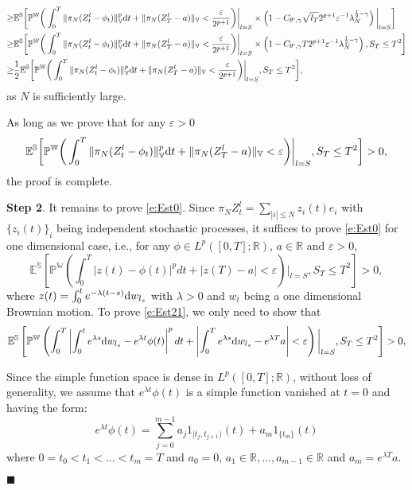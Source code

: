 \documentclass[12pt,a4paper]{article}
\theoremstyle{definition}
\theoremstyle{remark}
\numberwithin{equation}{section}
\newcommand{\E}{\mathbb{E}}            %
\newcommand{\e}{\varepsilon}
\newcommand{\HH}{\mathbb{H}}
\newcommand{\VV}{\mathbb{V}}
\newcommand{\R}{\mathbb{R}}
\newcommand{\PP}{\mathbb{P}}
\newcommand{\beq}{\begin{equation}}
\newcommand{\nneq}{\end{equation}}
\newcommand{\Be}{\begin{equation}}
\newcommand{\Ee}{\end{equation}}
\newcommand{\dif}{{\rm d}}
\def\EE{\mathbb{E}}\def\GG{\mathbb G}\def\HH{\mathbb H}\def\KK{\mathbb K}
\def\RR{\mathbb{R}}\def\WW{\mathbb W}\def\ZZ{\mathbb Z}
\def\SS{\mathbb S}
\newenvironment{proof}{\par\noindent{\bf Proof:}}{\hspace*{\fill}$\blacksquare$\par}
\begin{document}
{\begin{proof}
\begin{align*}
\ge &\EE^{\SS}\bigg[\PP^{\WW}\bigg(\int_0^T \|\pi_N(Z^l_t-\phi_t)\|_{\VV}^p \dif t+\|\pi_N(Z^l_T-a)\|_{\VV}<\frac{\e}{2^{p+1}}\bigg)\bigg|_{l=S} \times \left(1- C_{\theta',\gamma} \sqrt{l_T} 2^{p+1} {\e}^{-1} \lambda_N^{\frac12-\gamma}\right)\bigg|_{l=S} \bigg] \\
\ge & \EE^{\SS}\bigg[\PP^{\WW}\bigg(\int_0^T \|\pi_N(Z^l_t-\phi_t)\|_{\VV}^p \dif t+\|\pi_N(Z^l_T-a)\|_{\VV}<\frac{\e}{2^{p+1}}\bigg)\bigg|_{l=S} \times \left(1- C_{\theta',\gamma} T 2^{p+1} {\e}^{-1} \lambda_N^{\frac12-\gamma}\right), S_T \le T^2\bigg] \\
\ge & \frac 12\EE^{\SS}\bigg[\PP^{\WW}\bigg(\int_0^T \|\pi_N(Z^l_t-\phi_t)\|_{\VV}^p \dif t+\|\pi_N(Z^l_T-a)\|_{\VV}<\frac{\e}{2^{p+1}}\bigg)\bigg|_{l=S}, S_T \le T^2\bigg],
\end{align*}
as $N$ is sufficiently large.

As long as we prove that for any $\e>0$
\Be \label{e:Est0}
\EE^{\SS}\bigg[\PP^{\WW}\bigg(\int_0^T \|\pi_N(Z^l_t-\phi_t)\|_{\VV}^p \dif t+\|\pi_N(Z^l_T-a)\|_{\VV}<\e\bigg)\bigg|_{l=S}, S_T \le T^2\bigg]>0,
\Ee
the proof is complete.
\vskip0.3cm

{\bf Step 2}. It remains to prove \eqref{e:Est0}. Since $\pi_N Z^l_t=\sum_{|i| \le N} z_i(t) e_i$ with $\{z_i(t)\}_i $ being independent stochastic processes, it suffices to prove \eqref{e:Est0} for  one  dimensional case, i.e., for any $\phi \in L^p([0,T];\R)$, $a \in \R$ and $\e>0$,
\ \ \
\Be \label{e:Est21}
\E^{\SS}\left[\PP^{\WW}\left(\int_0^T |z(t)-\phi(t)|^p dt+|z(T)-a|<\e\right)\bigg|_{l=S}, S_T \le T^2\right]>0,
\Ee
where $z(t)=\int_0^t e^{-\lambda (t-s)} \dif w_{l_s}$ with $\lambda>0$ and $w_{t}$ being a one dimensional Brownian motion. To prove
\eqref{e:Est21}, we only need to show that
 \Be \label{e:Est2}
\E^{\SS}\left[\PP^{\WW}\left(\int_0^T \left|\int_0^t e^{\lambda s}\dif w_{l_s}-e^{\lambda t} \phi(t)\right|^p dt+\left|\int_0^T e^{\lambda s}\dif w_{l_s}-e^{\lambda T}a\right|<\e\right)\bigg|_{l=S}, S_T \le T^2\right]>0,
\Ee




Since the  simple function space is dense in $L^p([0,T];\RR)$, without loss of generality, we assume that $e^{\lambda t} \phi(t)$ is a simple function vanished at $t=0$ and having the form:
\ \ \
\beq
e^{\lambda t}\phi(t)=\sum_{j=0}^{m-1} a_j 1_{[t_j,t_{j+1})}(t)+a_m 1_{\{t_m\}}(t)
\nneq
where $0=t_0<t_1<...<t_{m}=T$ and $a_0=0$, $a_1 \in \R,...,a_{m-1} \in \R$ and $a_m=e^{\lambda T} a$.


\end{proof}}
\end{document}
